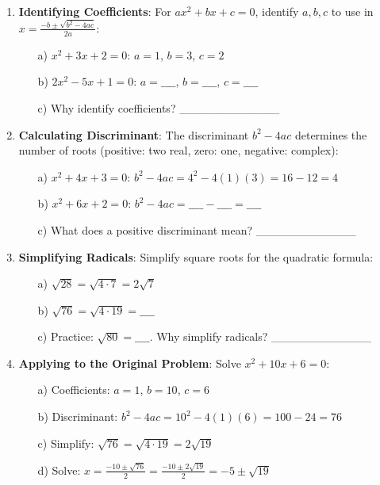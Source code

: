 \documentclass[12pt]{article}
\begin{document}
\begin{enumerate}[label=25.\arabic*]
    \item \textbf{Identifying Coefficients}: For \( ax^2 + bx + c = 0 \), identify \( a, b, c \) to use in \( x = \frac{-b \pm \sqrt{b^2 - 4ac}}{2a} \):
    \begin{enumerate}
        \item[a)] \( x^2 + 3x + 2 = 0 \): \( a = 1 \), \( b = 3 \), \( c = 2 \)
        \item[b)] \( 2x^2 - 5x + 1 = 0 \): \( a = \_\_\_\_ \), \( b = \_\_\_\_ \), \( c = \_\_\_\_ \)
        \item[c)] Why identify coefficients? \_\_\_\_\_\_\_\_\_\_\_\_
    \end{enumerate}
    \item \textbf{Calculating Discriminant}: The discriminant \( b^2 - 4ac \) determines the number of roots (positive: two real, zero: one, negative: complex):
    \begin{enumerate}
        \item[a)] \( x^2 + 4x + 3 = 0 \): \( b^2 - 4ac = 4^2 - 4(1)(3) = 16 - 12 = 4 \)
        \item[b)] \( x^2 + 6x + 2 = 0 \): \( b^2 - 4ac = \_\_\_\_ - \_\_\_\_ = \_\_\_\_ \)
        \item[c)] What does a positive discriminant mean? \_\_\_\_\_\_\_\_\_\_\_\_
    \end{enumerate}
    \item \textbf{Simplifying Radicals}: Simplify square roots for the quadratic formula:
    \begin{enumerate}
        \item[a)] \( \sqrt{28} = \sqrt{4 \cdot 7} = 2\sqrt{7} \)
        \item[b)] \( \sqrt{76} = \sqrt{4 \cdot 19} = \_\_\_\_ \)
        \item[c)] Practice: \( \sqrt{80} = \_\_\_\_ \). Why simplify radicals? \_\_\_\_\_\_\_\_\_\_\_\_
    \end{enumerate}
    \item \textbf{Applying to the Original Problem}: Solve \( x^2 + 10x + 6 = 0 \):
    \begin{enumerate}
        \item[a)] Coefficients: \( a = 1 \), \( b = 10 \), \( c = 6 \)
        \item[b)] Discriminant: \( b^2 - 4ac = 10^2 - 4(1)(6) = 100 - 24 = 76 \)
        \item[c)] Simplify: \( \sqrt{76} = \sqrt{4 \cdot 19} = 2\sqrt{19} \)
        \item[d)] Solve: \( x = \frac{-10 \pm \sqrt{76}}{2} = \frac{-10 \pm 2\sqrt{19}}{2} = -5 \pm \sqrt{19} \)
    \end{enumerate}
\end{enumerate}
\end{document}
